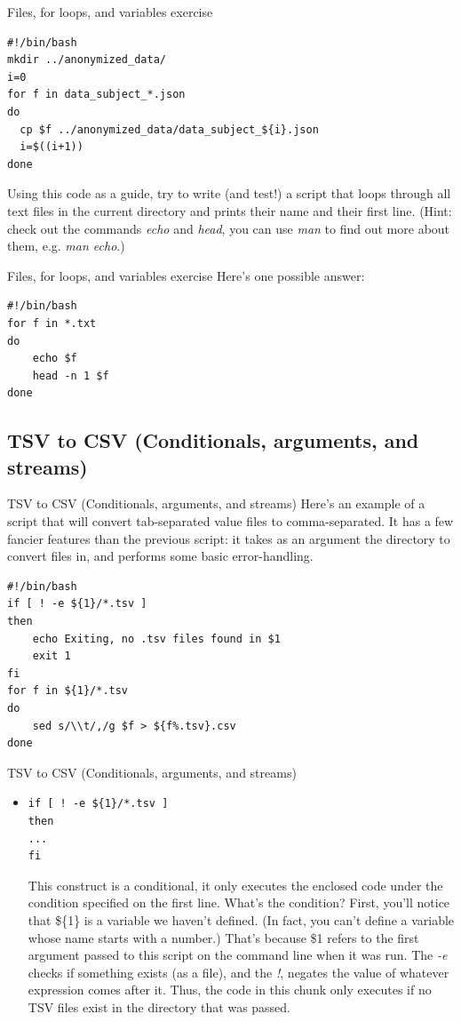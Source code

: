 \documentclass{beamer}
\begin{document}
\begin{frame}[fragile]{Files, for loops, and variables exercise}
\begin{lstlisting}[title=anonymize.sh]
#!/bin/bash
mkdir ../anonymized_data/
i=0
for f in data_subject_*.json
do
  cp $f ../anonymized_data/data_subject_${i}.json
  i=$((i+1))
done
\end{lstlisting}
Using this code as a guide, try to write (and test!) a script that loops through all text files in the current directory and prints their name and their first line. (Hint: check out the commands \emph{echo} and \emph{head}, you can use \emph{man} to find out more about them, e.g. \emph{man echo}.) 
\end{frame}

\begin{frame}[fragile]{Files, for loops, and variables exercise}
Here's one possible answer:
\begin{lstlisting}[title=text\_preview.sh]
#!/bin/bash
for f in *.txt
do
    echo $f
    head -n 1 $f
done
\end{lstlisting}
\end{frame}

\subsection{TSV to CSV (Conditionals, arguments, and streams)}
\begin{frame}[fragile]{TSV to CSV (Conditionals, arguments, and streams)}
Here's an example of a script that will convert tab-separated value files to comma-separated. It has a few fancier features than the previous script: it takes as an argument the directory to convert files in, and performs some basic error-handling.
\begin{lstlisting}[title=tsv\_to\_csv.sh]
#!/bin/bash
if [ ! -e ${1}/*.tsv ]
then
    echo Exiting, no .tsv files found in $1
    exit 1
fi 
for f in ${1}/*.tsv
do
    sed s/\\t/,/g $f > ${f%.tsv}.csv
done
\end{lstlisting}
\end{frame}


\begin{frame}[fragile]{TSV to CSV (Conditionals, arguments, and streams)}
\begin{itemize}
\item<1->
\begin{lstlisting}
if [ ! -e ${1}/*.tsv ]
then
...
fi
\end{lstlisting} 
This construct is a conditional, it only executes the enclosed code under the condition specified on the first line. What's the condition? First, you'll notice that \$\{1\} is a variable we haven't defined. (In fact, you can't define a variable whose name starts with a number.) That's because \$1 refers to the first argument passed to this script on the command line when it was run. The \emph{-e} checks if something exists (as a file), and the \emph{!}, negates the value of whatever expression comes after it. Thus, the code in this chunk only executes if no TSV files exist in the directory that was passed.
\end{itemize}
\end{frame}
\end{document}
